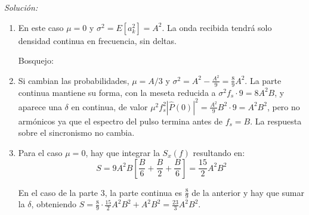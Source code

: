 \documentclass[a4paper,11pt]{article}
\newenvironment{solucion}[1][]{
\noindent \large \textsl{Solución:} \ifthenelse{\equal{#1}{}}{}{\emph{(#1)}}

\smallskip
}{
\bigskip
}
\begin{document}
\begin{solucion}
\begin{enumerate}
\item En este caso $\mu=0$ y $\sigma^2 = E[a_k^2]= A^2$. La onda recibida tendrá solo densidad continua en frecuencia, sin deltas.

Bosquejo:
         \begin{center}
        \end{center}


\item Si cambian las probabilidades, $\mu=A/3$ y $\sigma^2=A^2-\frac{A^2}{9}=\frac{8}{9}A^2$. La parte continua mantiene su forma, con la meseta reducida a $\sigma^2f_s\cdot 9=8A^2B$, y aparece una $\delta$ en continua, de valor $\mu^2 f_s^2|\hat P(0)|^2=\frac{A^2}{9}B^2\cdot 9=A^2B^2$, pero no armónicos ya que el espectro del pulso termina antes de $f_s=B$. La respuesta sobre el sincronismo no cambia.

\item Para el caso $\mu=0$, hay que integrar la $S_x(f)$ resultando en:
 \begin{equation*}
        S = 9A^2 B \left[\frac{B}{6} + \frac{B}{2} + \frac{B}{6} \right] = \frac{15}{2}A^2 B^2
 \end{equation*}

 En el caso de la parte 3, la parte continua es $\frac89$ de la anterior y hay que sumar la $\delta$, obteniendo $S=\frac{8}{9}\cdot\frac{15}{2}A^2 B^2 + A^2B^2=\frac{23}{3}A^2B^2$.


\end{enumerate}
\end{solucion}
\end{document}
